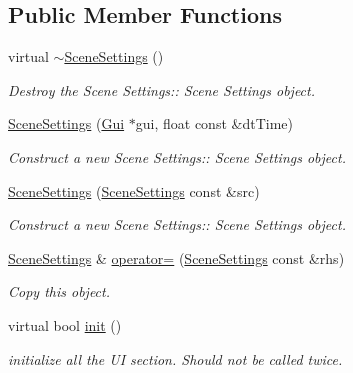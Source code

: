 \subsection*{Public Member Functions}
\begin{DoxyCompactItemize}
\item 
\mbox{\label{class_scene_settings_a1be1700ae68d0e88f68acd16ea2f10aa}} 
virtual \hyperlink{class_scene_settings_a1be1700ae68d0e88f68acd16ea2f10aa}{$\sim$\+Scene\+Settings} ()
\begin{DoxyCompactList}\small\item\em Destroy the Scene Settings\+:\+: Scene Settings object. \end{DoxyCompactList}\item 
\hyperlink{class_scene_settings_a92c62a92d2476e1edbd3acaba5855d2e}{Scene\+Settings} (\hyperlink{class_gui}{Gui} $\ast$gui, float const \&dt\+Time)
\begin{DoxyCompactList}\small\item\em Construct a new Scene Settings\+:\+: Scene Settings object. \end{DoxyCompactList}\item 
\hyperlink{class_scene_settings_aa7091a9a5c7a797ebdff690a38fcc2ca}{Scene\+Settings} (\hyperlink{class_scene_settings}{Scene\+Settings} const \&src)
\begin{DoxyCompactList}\small\item\em Construct a new Scene Settings\+:\+: Scene Settings object. \end{DoxyCompactList}\item 
\hyperlink{class_scene_settings}{Scene\+Settings} \& \hyperlink{class_scene_settings_ad650f1a581258755fae7b25fee8ddc3f}{operator=} (\hyperlink{class_scene_settings}{Scene\+Settings} const \&rhs)
\begin{DoxyCompactList}\small\item\em Copy this object. \end{DoxyCompactList}\item 
\mbox{\label{class_scene_settings_a19323950409add2d1b0df92799acf4d2}} 
virtual bool \hyperlink{class_scene_settings_a19323950409add2d1b0df92799acf4d2}{init} ()
\begin{DoxyCompactList}\small\item\em initialize all the UI section. Should not be called twice. \end{DoxyCompactList}\item 

\end{DoxyCompactItemize}
